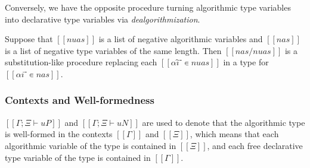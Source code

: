 Conversely, we have the opposite procedure turning algorithmic type variables
into declarative type variables via \emph{dealgorithmization}.

\begin{definition}
  Suppose that $[[nuas]]$ is a list of negative algorithmic variables
  and $[[nas]]$ is a list of negative type variables of the same length. 
  Then $[[ nas/nuas ]]$ is a substitution-like procedure replacing each
  $[[αî⁻ ∊ {nuas}]]$ in a type for $[[αi⁻ ∊ {nas}]]$.
\end{definition}

\subsubsection{Contexts and Well-formedness}


$[[Γ ; Ξ ⊢ uP]]$ and $[[Γ ; Ξ ⊢ uN]]$ are used to denote
that the algorithmic type is well-formed in the contexts
$[[Γ]]$ and $[[Ξ]]$, which means that each algorithmic variable
of the type is contained in $[[Ξ]]$, and each free declarative type variable
of the type is contained in $[[Γ]]$.

\begin{algorithm}
  \hfill
  
  \begin{minipage}[t]{0.48\textwidth}
    \ottdefnWFATNauWFLabeled[\apppref]{}
  \end{minipage}%
  \hfill
  \begin{minipage}[t]{0.48\textwidth}
    \ottdefnWFATPauWFLabeled[\apppref]{}
  \end{minipage}
\end{algorithm}


